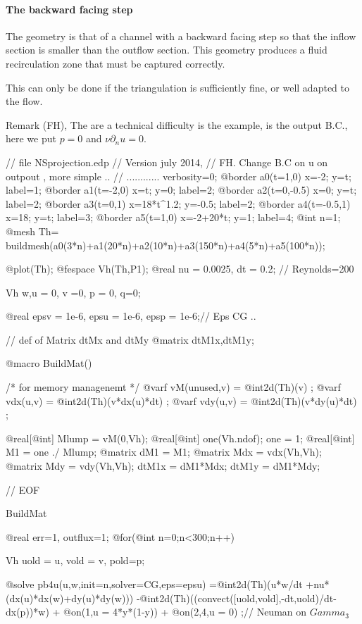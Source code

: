 \documentclass[a4paper,twoside,12pt]{book}
\def\p{\partial}
\begin{document}
\paragraph{The backward facing step}

The geometry is that of a channel with a backward facing step so that
the inflow section is smaller than the outflow section. This geometry
produces a fluid recirculation zone that must be captured correctly.

This can only be done if the triangulation is sufficiently fine, or
well adapted to the flow.

Remark (FH), The are a technical difficulty is the example, is the output B.C., here 
we put $p=0$ and $ \nu \p_n u = 0$.  

\begin{example}
\bFF
// file NSprojection.edp
// Version july 2014, 
// FH. Change B.C on u on outpout , more simple .. 
// ............
verbosity=0;
@border a0(t=1,0){ x=-2;      y=t;      label=1;}
@border a1(t=-2,0){ x=t;    y=0;        label=2;}
@border a2(t=0,-0.5){ x=0;      y=t;       label=2;}
@border a3(t=0,1){ x=18*t^1.2;  y=-0.5;       label=2;}
@border a4(t=-0.5,1){ x=18;     y=t;   label=3;}
@border a5(t=1,0){ x=-2+20*t; y=1;        label=4;}
@int n=1;
@mesh Th= buildmesh(a0(3*n)+a1(20*n)+a2(10*n)+a3(150*n)+a4(5*n)+a5(100*n));

@plot(Th);
@fespace Vh(Th,P1);
@real nu = 0.0025, dt = 0.2; // Reynolds=200

Vh w,u = 0, v =0, p = 0, q=0;

@real epsv = 1e-6, epsu = 1e-6, epsp = 1e-6;// Eps CG ..

 // def of Matrix dtMx and dtMy
@matrix dtM1x,dtM1y;
 
@macro  BuildMat()
 { /* for memory managenemt */
   @varf vM(unused,v) = @int2d(Th)(v) ;
   @varf vdx(u,v) = @int2d(Th)(v*dx(u)*dt) ;
   @varf vdy(u,v) = @int2d(Th)(v*dy(u)*dt) ;

   @real[@int] Mlump = vM(0,Vh); 
   @real[@int] one(Vh.ndof); one = 1;  
   @real[@int] M1 =  one ./ Mlump; 
   @matrix dM1 = M1;
   @matrix Mdx = vdx(Vh,Vh);
   @matrix Mdy = vdy(Vh,Vh);
   dtM1x = dM1*Mdx;
   dtM1y = dM1*Mdy; 
 }// EOF \hfilll
 
BuildMat

@real err=1, outflux=1;
@for(@int n=0;n<300;n++)
 {	
  Vh uold = u,  vold = v, pold=p;
  
  @solve pb4u(u,w,init=n,solver=CG,eps=epsu)
        =@int2d(Th)(u*w/dt +nu*(dx(u)*dx(w)+dy(u)*dy(w)))
        -@int2d(Th)((convect([uold,vold],-dt,uold)/dt-dx(p))*w)
        + @on(1,u = 4*y*(1-y)) + @on(2,4,u = 0) ;// Neuman on $Gamma_3$
       
}
\end{example}
\end{document}
